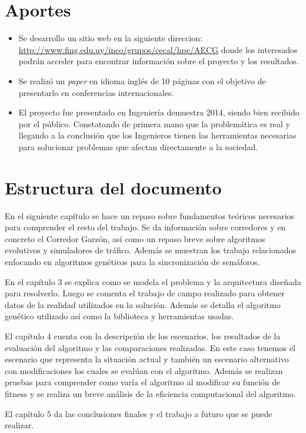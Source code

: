 \section{Aportes}

\begin{itemize}
	\item Se desarrollo un sitio web en la siguiente direccion: \url{http://www.fing.edu.uy/inco/grupos/cecal/hpc/AECG} donde los interesados podrán acceder para encontrar información sobre el proyecto y los resultados. 
	\item Se realizó un \emph{paper} en idioma inglés de 10 páginas con el objetivo de presentarlo en conferencias internacionales.
	\item El proyecto fue presentado en Ingeniería demuestra 2014, siendo bien recibido por el público. Constatando de primera mano que la problemática es real y llegando a la conclusión que los Ingenieros tienen las herramientas necesarias para solucionar problemas que afectan directamente a la sociedad.

\end{itemize}






\section{Estructura del documento}
En el siguiente capítulo se hace un repaso sobre fundamentos teóricos necesarios para comprender el resto del trabajo. Se da información sobre corredores y en concreto el Corredor Garzón, así como un repaso breve sobre algoritmos evolutivos y simuladores de tráfico. Además se muestran los trabajo relacionados enfocando en algoritmos genéticos para la sincronización de semáforos.

En el capítulo 3 se explica como se modela el problema y la arquitectura diseñada  para resolverlo. Luego se comenta el trabajo de campo realizado para obtener datos de la realidad utilizados en la solución. Además se detalla el algoritmo genético utilizado así como la biblioteca y herramientas usadas.

El capítulo 4 cuenta con la descripción de los escenarios, los resultados de la evaluación del algoritmo y las comparaciones realizadas. En este caso tenemos el escenario que representa la situación actual y también un escenario alternativo con modificaciones los cuales se evalúan con el algoritmo. Además se realizan pruebas para comprender como varía el algoritmo al modificar su función de fitness y se realiza un breve análisis de la eficiencia computacional del algoritmo.

El capítulo 5 da las conclusiones finales y el trabajo a futuro que se puede realizar.






